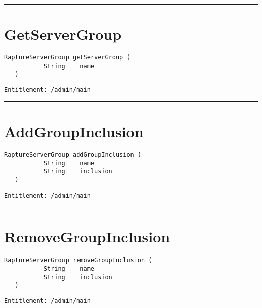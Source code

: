 \rule{12cm}{2pt}
\section{GetServerGroup}
\label{Api:GetServerGroup}
\begin{lstlisting}[style=nonumbers]
   RaptureServerGroup getServerGroup (
           String    name
   )
\end{lstlisting}
\begin{Verbatim}[formatcom=\color{Maroon}]
  Entitlement: /admin/main
\end{Verbatim}



\rule{12cm}{2pt}
\section{AddGroupInclusion}
\label{Api:AddGroupInclusion}
\begin{lstlisting}[style=nonumbers]
   RaptureServerGroup addGroupInclusion (
           String    name
           String    inclusion
   )
\end{lstlisting}
\begin{Verbatim}[formatcom=\color{Maroon}]
  Entitlement: /admin/main
\end{Verbatim}



\rule{12cm}{2pt}
\section{RemoveGroupInclusion}
\label{Api:RemoveGroupInclusion}
\begin{lstlisting}[style=nonumbers]
   RaptureServerGroup removeGroupInclusion (
           String    name
           String    inclusion
   )
\end{lstlisting}
\begin{Verbatim}[formatcom=\color{Maroon}]
  Entitlement: /admin/main
\end{Verbatim}




